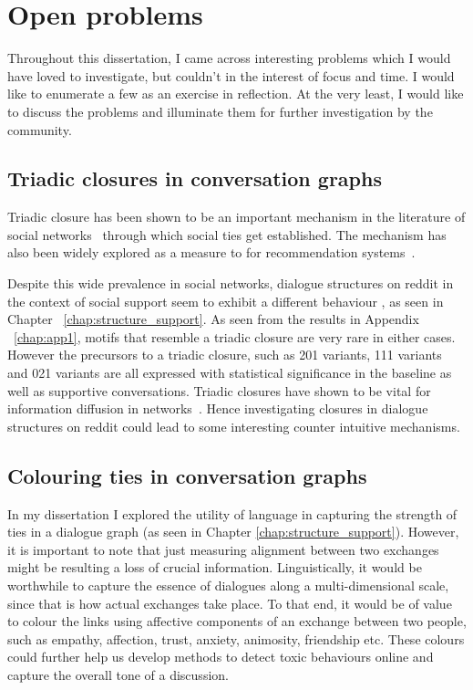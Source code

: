 \section{Open problems}
Throughout this dissertation, I came across interesting problems which I would have loved to investigate, but couldn't in the interest of focus and time. I would like to enumerate a few as an exercise in reflection. At the very least, I would like to discuss the problems and illuminate them for further investigation by the community. 

\subsection{Triadic closures in conversation graphs}
Triadic closure has been shown to be an important mechanism in the literature of social networks~\cite{granovetter1977strength,mollenhorst2011shared} through which social ties get established. The mechanism has also been widely explored as a measure to for recommendation systems~\cite{sintos2014using,lou2013learning}.

Despite this wide prevalence in social networks, dialogue structures on reddit in the context of social support seem to exhibit a different behaviour , as seen in Chapter ~\ref{chap:structure_support}. As seen from the results in Appendix ~\ref{chap:app1}, motifs that resemble a triadic closure are very rare in either cases. However the precursors to a triadic closure, such as 201 variants, 111 variants and 021 variants are all expressed with statistical significance in the baseline as well as supportive conversations. Triadic closures have shown to be vital for information diffusion in networks~\cite{babaei2016efficiency}. Hence investigating closures in dialogue structures on reddit could lead to some interesting counter intuitive mechanisms.

\subsection{Colouring ties in conversation graphs}
In my dissertation I explored the utility of language in capturing the strength of ties in a dialogue graph (as seen in Chapter \ref{chap:structure_support}). However, it is important to note that just measuring alignment between two exchanges might be resulting a loss of crucial information. Linguistically, it would be worthwhile to capture the essence of dialogues along a multi-dimensional scale, since that is how actual exchanges take place. 
To that end, it would be of value to colour the links using affective components of an exchange between two people, such as empathy, affection, trust, anxiety, animosity, friendship etc. These colours could further help us develop methods to detect toxic behaviours online and capture the overall tone of a discussion. 

